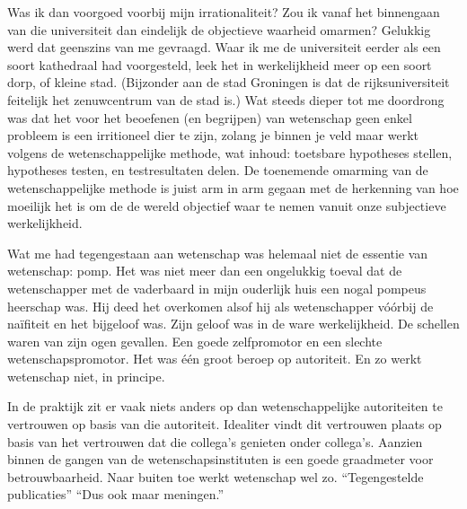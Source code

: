 \documentclass[12pt,a4paper]{article}
\begin{document}
Was ik dan voorgoed voorbij mijn irrationaliteit? Zou ik vanaf het binnengaan van die universiteit dan eindelijk de objectieve waarheid omarmen? Gelukkig werd dat geenszins van me gevraagd. Waar ik me de universiteit eerder als een soort kathedraal had voorgesteld, leek het in werkelijkheid meer op een soort dorp, of kleine stad. (Bijzonder aan de stad Groningen is dat de rijksuniversiteit feitelijk het zenuwcentrum van de stad is.) Wat steeds dieper tot me doordrong was dat het voor het beoefenen (en begrijpen) van wetenschap geen enkel probleem is een irritioneel dier te zijn, zolang je binnen je veld maar werkt volgens de wetenschappelijke methode, wat inhoud: toetsbare hypotheses stellen, hypotheses testen, en testresultaten delen. De toenemende omarming van de wetenschappelijke methode is juist arm in arm gegaan met de herkenning van hoe moeilijk het is om de de wereld objectief waar te nemen vanuit onze subjectieve werkelijkheid.

Wat me had tegengestaan aan wetenschap was helemaal niet de essentie van wetenschap: pomp. Het was niet meer dan een ongelukkig toeval dat de wetenschapper met de vaderbaard in mijn ouderlijk huis een nogal pompeus heerschap was. Hij deed het overkomen alsof hij als wetenschapper vóórbij de naïfiteit en het bijgeloof was. Zijn geloof was in de ware werkelijkheid. De schellen waren van zijn ogen gevallen. Een goede zelfpromotor en een slechte wetenschapspromotor. Het was één groot beroep op autoriteit. En zo werkt wetenschap niet, in principe.

In de praktijk zit er vaak niets anders op dan wetenschappelijke autoriteiten te vertrouwen op basis van die autoriteit. Idealiter vindt dit vertrouwen plaats op basis van het vertrouwen dat die collega's genieten onder collega's. Aanzien binnen de gangen van de wetenschapsinstituten is een goede graadmeter voor betrouwbaarheid. %
Naar buiten toe werkt wetenschap wel zo. “Tegengestelde publicaties” “Dus ook maar meningen.”

\end{document}

